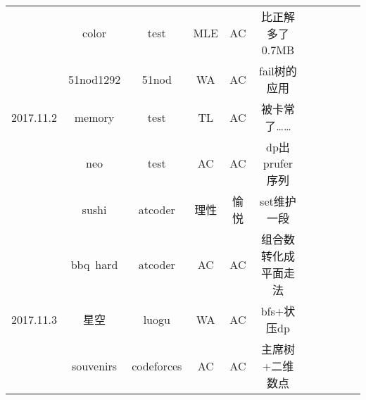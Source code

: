 \documentclass[landscape]{article}
\begin{document}
\begin{longtable}{ccccccccccc}
  & color & test & MLE & AC & 比正解多了0.7MB\\
  & 51nod1292 & 51nod & WA & AC & fail树的应用\\
  \hline
  2017.11.2 & memory & test & TL & AC & 被卡常了……\\
  & neo & test & AC & AC & dp出prufer序列\\
  & sushi & atcoder & 理性 & 愉悦 & set维护一段\\
  & bbq\ hard & atcoder & AC & AC & 组合数转化成平面走法\\
  \hline
  2017.11.3 & 星空 & luogu & WA & AC & bfs+状压dp\\
  & souvenirs & codeforces & AC & AC & 主席树+二维数点\\
  \hline
\end{longtable}
\end{document}
